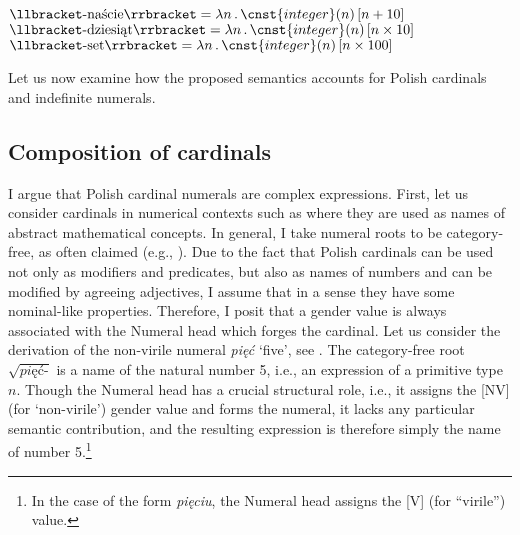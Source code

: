 \documentclass[output=paper,
]{langscibook}
\begin{document}
	\ea \label{ex:cardinal-suffixes-semantics} \ea $\llbracket \text{-naście}\rrbracket = \lambda n\,.\,\cnst{integer}(n)\,[n+10]$\label{ex:cardinal-suffixes-teen}
\ex $\llbracket \text{-dziesiąt}\rrbracket = \lambda n\,.\,\cnst{integer}(n)\,[n\times 10]$\label{ex:cardinal-suffixes-ty}
\ex $\llbracket \text{-set}\rrbracket = \lambda n\,.\,\cnst{integer}(n)\,[n\times 100]$\label{ex:cardinal-suffixes-hundred}
	\z
    \z

\begin{multicols}{2}
	\ea \label{ex:cardinal-suffixes-integers} \columnbreak
	\z
    \z
\end{multicols}

\noindent Let us now examine how the proposed semantics accounts for Polish cardinals and indefinite numerals. 
	
	\subsection{Composition of cardinals}\label{sec:composition-of-cardinals}

\largerpage[2]
I argue that Polish cardinal numerals are complex expressions. First, let us consider cardinals in numerical contexts such as  where they are used as names of abstract mathematical concepts. In general, I take numeral roots to be category-free, as often claimed (e.g., \citealt{halle_marantz1993distributed}). Due to the fact that Polish cardinals can be used not only as modifiers and predicates, but also as names of numbers and can be modified by agreeing adjectives, I assume that in a sense they have some nominal-like properties. Therefore, I posit that a gender value is always associated with the Numeral head which forges the cardinal. Let us consider the derivation of the non-virile numeral \textit{pięć} `five', see . The category-free root $\sqrt{\textit{pięć-}}$ is a name of the natural number 5, i.e., an expression of a primitive type $n$. Though the Numeral head has a crucial structural role, i.e., it assigns the [NV] (for `non-virile') gender value and forms the numeral, it lacks any particular semantic contribution, and the resulting expression  is therefore simply the name of number 5.\footnote{In the case of the form \textit{pięciu}, the Numeral head assigns the [V] (for ``virile'') value.}
\end{document}
